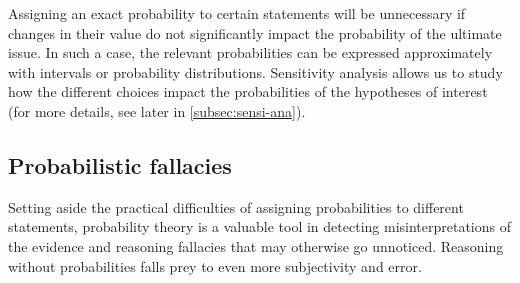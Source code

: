\documentclass{article}
\newcommand{\pr}{\mathsf{Pr}}
\begin{document}
%
%
%
%
%
Assigning an exact probability to certain statements will be  unnecessary if changes in their value do not significantly impact the probability of the ultimate issue. 
In such a case, the relevant probabilities can be expressed approximately with intervals or probability distributions.
Sensitivity analysis 
allows us to study how the different choices impact the probabilities of the hypotheses of interest (for more details, see later in \ref{subsec:sensi-ana}).

\subsection{Probabilistic fallacies}\label{sec:fallacies}

Setting aside the practical difficulties of assigning probabilities
to different statements,
probability theory is a valuable tool in detecting misinterpretations of the evidence and reasoning fallacies that may otherwise go unnoticed. Reasoning without probabilities falls prey to even more subjectivity and error. 
\end{document}
